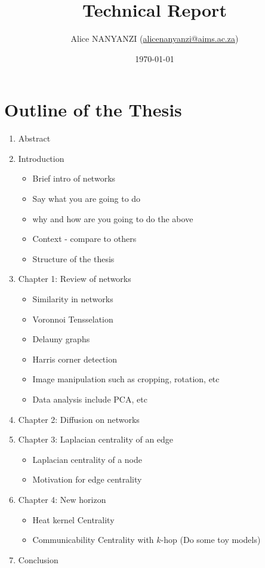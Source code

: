 \documentclass[10pt,a4paper]{article}
\author{Alice NANYANZI (\href{mailto:alicenanyanzi@aims.ac.za}{alicenanyanzi@aims.ac.za})}
\title{Technical Report}
\date{\today}
\begin{document}
	\maketitle
	
	\section*{Outline of the Thesis}
	\begin{enumerate}
		\item Abstract
		\item Introduction
		\begin{itemize}
			\item Brief intro of networks
			\item Say what you are going to do
			\item why and how are you going to do the above 
			\item Context - compare to others
			\item Structure of the thesis
		\end{itemize}
	    \item Chapter 1: Review of networks
	     \begin{itemize}
	     	\item Similarity in networks
	     	\item Voronnoi Tensselation
	     	\item Delauny graphs
	     	\item Harris corner detection
	     	\item Image manipulation such as cropping, rotation, etc
	     	\item Data analysis include PCA, etc
	     \end{itemize}
        \item Chapter 2: Diffusion on networks
        \item Chapter 3: Laplacian centrality of an edge
        \begin{itemize}
        	\item Laplacian centrality of a node
        	\item Motivation for edge centrality
        \end{itemize}
        \item Chapter 4: New horizon
        \begin{itemize}
        	\item Heat kernel Centrality
        	\item Communicability Centrality with $k$-hop (Do some toy models)
        \end{itemize}
        \item Conclusion
	\end{enumerate}
	
\end{document}

